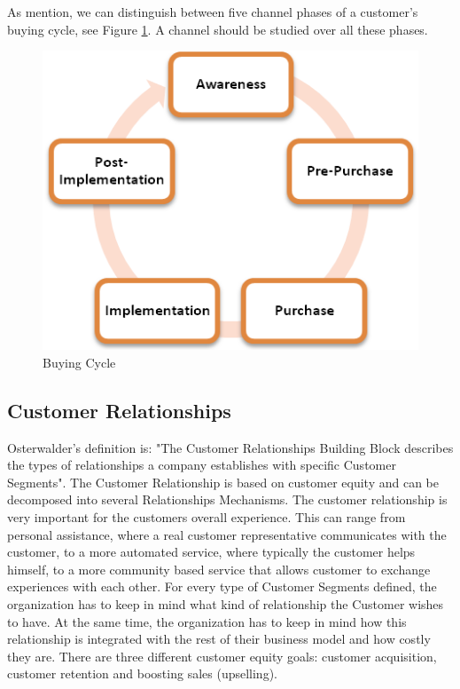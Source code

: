 As mention, we can distinguish between five channel phases of a customer's buying cycle, see Figure \ref{fig:BuyingCycle}. A channel should be studied over all these phases.

\begin{figure}[h]
\caption[BuyingCycle]{Buying Cycle \cite{token}}
\label{fig:BuyingCycle}
\begin{center}
\includegraphics[scale=1.0]{5BuyingStages.png}
\end{center}
\end{figure} 

\newpage
\subsection{Customer Relationships}
Osterwalder's definition is: "The Customer Relationships Building Block describes the types of relationships a company establishes with specific Customer Segments". The Customer Relationship is based on customer equity and can be decomposed into several Relationships Mechanisms. The customer relationship is very important for the customers overall experience. This can range from personal assistance, where a real customer representative communicates with the customer, to a more automated service, where typically the customer helps himself,  to a more community based service that allows customer to exchange experiences with each other. For every type of Customer Segments defined, the organization has to keep in mind what kind of relationship the Customer wishes to have. At the same time, the organization has to keep in mind how this relationship is integrated with the rest of their business model and how costly they are. There are three different customer equity goals: customer acquisition, customer retention and boosting sales (upselling).

